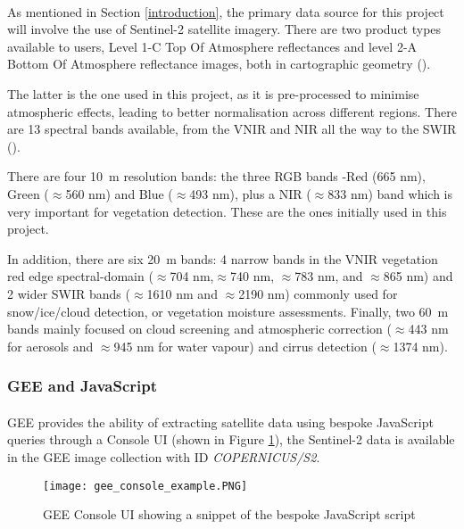 \paragraph{}
As mentioned in Section \ref{introduction}, the primary data source for this project will involve the use of Sentinel-2 satellite imagery. There are two product types available to users, Level 1-C Top Of Atmosphere reflectances and level 2-A Bottom Of Atmosphere reflectance images, both in cartographic geometry (\cite{sentinel2}). 

The latter is the one used in this project, as it is pre-processed to minimise atmospheric effects, leading to better normalisation across different regions.
There are 13 spectral bands available, from the \gls{VNIR} and \gls{NIR} all the way to the \gls{SWIR} (\cite{sentinel2}).

There are four \SI{10}{\metre} resolution bands: the three \gls{RGB} bands -Red (665 nm), Green ($\approx$560 nm) and Blue ($\approx$493 nm), plus a \gls{NIR} ($\approx$833 nm) band which is very important for vegetation detection. These are the ones initially used in this project.

In addition, there are six \SI{20}{\metre} bands: 4 narrow bands in the \gls{VNIR} vegetation red edge spectral-domain ($\approx$704 nm,$\approx$740 nm, $\approx$783 nm, and $\approx$865 nm) and 2 wider \gls{SWIR} bands ($\approx$1610 nm and $\approx$2190 nm) commonly used for snow/ice/cloud detection, or vegetation moisture assessments. Finally, two \SI{60}{\metre} bands mainly focused on cloud screening and atmospheric correction ($\approx$443 nm for aerosols and $\approx$945 nm for water vapour) and cirrus detection ($\approx$1374 nm).
\subsubsection{\gls{GEE} and JavaScript}
\paragraph{}
\gls{GEE} provides the ability of extracting satellite data using bespoke JavaScript queries through a Console \gls{UI} (shown in Figure \ref{gee_console_ui}), the Sentinel-2 data is available in the \gls{GEE} image collection with ID \textit{COPERNICUS/S2}.

    \begin{figure}[hbt!]
        \centering
        \texttt{[image: gee\_console\_example.PNG]}
        \caption{\gls{GEE} Console \gls{UI} showing a snippet of the bespoke JavaScript script}
        \label{gee_console_ui}
    \end{figure}

